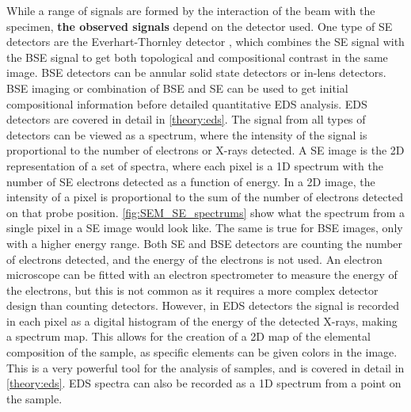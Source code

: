While a range of signals are formed by the interaction of the beam with the specimen, \textbf{the observed signals} depend on the detector used.
One type of SE detectors are the Everhart-Thornley detector \cite{everhart_detector1960}, which combines the SE signal with the BSE signal to get both topological and compositional contrast in the same image.
BSE detectors can be annular solid state detectors or in-lens detectors.
BSE imaging or combination of BSE and SE can be used to get initial compositional information before detailed quantitative EDS analysis.
EDS detectors are covered in detail in \cref{theory:eds}.
The signal from all types of detectors can be viewed as a spectrum, where the intensity of the signal is proportional to the number of electrons or X-rays detected.
A SE image is the 2D representation of a set of spectra, where each pixel is a 1D spectrum with the number of SE electrons detected as a function of energy.
In a 2D image, the intensity of a pixel is proportional to the sum of the number of electrons detected on that probe position.
\cref{fig:SEM_SE_spectrums} show what the spectrum from a single pixel in a SE image would look like.
The same is true for BSE images, only with a higher energy range.
Both SE and BSE detectors are counting the number of electrons detected, and the energy of the electrons is not used.
An electron microscope can be fitted with an electron spectrometer to measure the energy of the electrons, but this is not common as it requires a more complex detector design than counting detectors.
However, in EDS detectors the signal is recorded in each pixel as a digital histogram of the energy of the detected X-rays, making a spectrum map.
This allows for the creation of a 2D map of the elemental composition of the sample, as specific elements can be given colors in the image.
This is a very powerful tool for the analysis of samples, and is covered in detail in \cref{theory:eds}.
EDS spectra can also be recorded as a 1D spectrum from a point on the sample.


